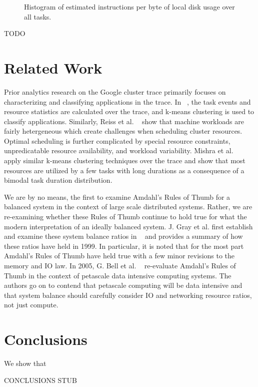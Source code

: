 \documentclass{sig-alternate}
\begin{document}
\begin{figure}
\centering
\label{est_act_cpu_disk}
\caption{Histogram of estimated instructions per byte of local disk usage over all tasks.}
\end{figure}


TODO

\section{Related Work}

Prior analytics research on the Google cluster trace primarily focuses on characterizing and classifying applications in the trace.
In ~\cite{clusterdata:Di2013}, the task events and resource statistics are calculated over the trace, and k-means clustering is used to classify applications.
Similarly, Reiss et al. ~\cite{clusterdata:Reiss2012b} show that machine workloads are fairly hetergeneous which create challenges when scheduling cluster resources.
Optimal scheduling is further complicated by special resource constraints, unpredicatable resource availability, and workload variability.
Mishra et al. ~\cite{clusterdata:Mishra2010} apply similar k-means clustering techniques over the trace and show that most resources are utilized by a few tasks with long durations as a consequence of a bimodal task duration distribution.

We are by no means, the first to examine Amdahl's Rules of Thumb for a balanced system in the context of large scale distributed systems.
Rather, we are re-examining whether these Rules of Thumb continue to hold true for what the modern interpretation of an ideally balanced system.
J. Gray et al. first establish and examine these system balance ratios in ~\cite{export:68636} and provides a summary of how these ratios have held in 1999.
In particular, it is noted that for the most part Amdahl's Rules of Thumb have held true with a few minor revisions to the memory and IO law.
In 2005, G. Bell et al. ~\cite{Bell:2006:PCS:1110638.1110681} re-evaluate Amdahl's Rules of Thumb in the context of petascale data intensive computing systems.
The authors go on to contend that petascale computing will be data intensive and that system balance should carefully consider IO and networking resource ratios, not just compute.


\section{Conclusions}

We show that 

CONCLUSIONS STUB






\end{document}
